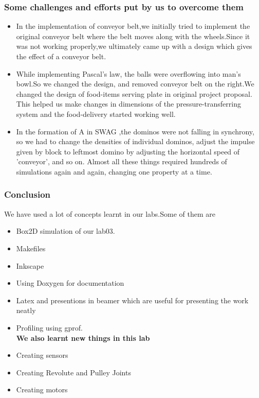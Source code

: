 \documentclass{beamer}
\begin{document}
\begin{frame}
 \frametitle{Some challenges and efforts put by us to overcome them}
 \begin{itemize}
 
 \item In the implementation of conveyor belt,we initially tried to implement the original conveyor belt where the belt moves along with the wheels.Since it was not working properly,we ultimately came up with a design which gives the effect of a conveyor belt.
 \item While implementing Pascal's law, the balls were overflowing into man's bowl.So we changed the design, and removed conveyor belt on the right.We changed the design of food-items 
serving plate in original project proposal. This helped us make changes in dimensions of the pressure-transferring system and the food-delivery started working well.
 \item In the formation of A in SWAG ,the dominos were not falling in synchrony, so we had to change the densities of individual dominos, adjust the impulse given by block to leftmost domino by adjusting the horizontal speed of 'conveyor', and so on. Almost all these things required hundreds of simulations again and again,
changing one property at a time.
\end{itemize}
\end{frame}


\begin{frame}
 \frametitle{Conclusion}
 We have used a lot of concepts learnt in our labs.Some of them are
 \begin{itemize}
 \item Box2D simulation of our lab03.
 \item Makefiles
 \item Inkscape
 \item Using Doxygen for documentation
 \item Latex and presentions in beamer which are useful for presenting the work neatly
 \item Profiling using gprof.\\
\textbf{We also learnt new things in this lab}
\item Creating sensors
\item Creating Revolute and Pulley Joints
\item Creating motors

\end{itemize}
\end{frame}
\end{document}
